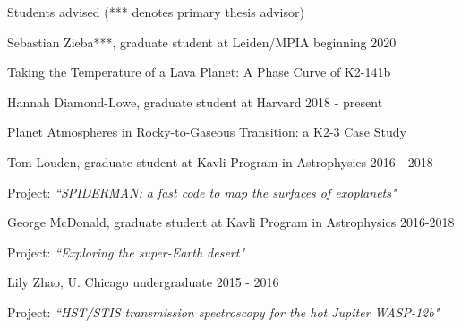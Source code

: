 \documentclass[12pt,letterpaper]{article}
\begin{document}
\begin{compactitem}[]
\item Students advised  (*** denotes primary thesis advisor)
	\begin{compactitem}
        \item Sebastian Zieba***, graduate student at Leiden/MPIA \hfill beginning 2020
		\begin{sloppypar}
		Taking the Temperature of a Lava Planet: A Phase Curve of K2-141b
		\end{sloppypar}
        \item Hannah Diamond-Lowe, graduate student at Harvard \hfill 2018 - present
		\begin{sloppypar}
		Planet Atmospheres in Rocky-to-Gaseous Transition: a K2-3 Case Study
		\end{sloppypar}
	\item Tom Louden, graduate student at Kavli Program in Astrophysics \hfill 2016 - 2018
		\begin{sloppypar}
		Project: \textit{``SPIDERMAN: a fast code to map the surfaces of exoplanets"}
		\end{sloppypar}
	\item George McDonald, graduate student at Kavli Program in Astrophysics \hfill 2016-2018
		\begin{sloppypar}
		Project: \textit{``Exploring the super-Earth desert"}
		\end{sloppypar}
	\item Lily Zhao, U. Chicago undergraduate \hfill 2015 - 2016
		\begin{sloppypar}
		Project: \textit{``HST/STIS transmission spectroscopy for the hot Jupiter WASP-12b"}
		\end{sloppypar}
	\end{compactitem}

\end{compactitem}
\end{document}
